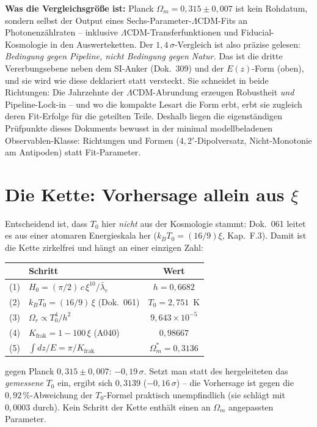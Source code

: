 \documentclass[11pt]{report}
\begin{document}
\textbf{Was die Vergleichsgröße ist:} Planck
$\Omega_m = 0{,}315 \pm 0{,}007$ ist kein Rohdatum, sondern
selbst der Output eines Sechs-Parameter-$\Lambda$CDM-Fits an
Photonenzählraten -- inklusive $\Lambda$CDM-Transferfunktionen
und Fiducial-Kosmologie in den Auswerteketten. Der
$1{,}4\,\sigma$-Vergleich ist also präzise gelesen:
\emph{Bedingung gegen Pipeline, nicht Bedingung gegen Natur.}
Das ist die dritte Vererbungsebene neben dem SI-Anker (Dok.~309)
und der $E(z)$-Form (oben), und sie wird wie diese deklariert
statt versteckt. Sie schneidet in beide Richtungen: Die
Jahrzehnte der $\Lambda$CDM-Abrundung erzeugen Robustheit
\emph{und} Pipeline-Lock-in -- und wo die kompakte Lesart die
Form erbt, erbt sie zugleich deren Fit-Erfolge für die geteilten
Teile. Deshalb liegen die eigenständigen Prüfpunkte dieses
Dokuments bewusst in der minimal modellbeladenen
Observablen-Klasse: Richtungen und Formen
($4{,}2'$-Dipolversatz, Nicht-Monotonie am Antipoden) statt
Fit-Parameter.

\section{Die Kette: Vorhersage allein aus $\xi$}

Entscheidend ist, dass $T_0$ hier \emph{nicht} aus der Kosmologie
stammt: Dok.~061 leitet es aus einer atomaren Energieskala her
($k_BT_0 = (16/9)\xi$, Kap.~F.3). Damit ist die Kette zirkelfrei
und hängt an einer einzigen Zahl:

\begin{center}
\begin{tabular}{clc}
\toprule
 & Schritt & Wert \\
\midrule
(1) & $H_0 = (\pi/2)\,c\,\xi^{10}/\bar\lambda_e$ & $h = 0{,}6682$ \\
(2) & $k_BT_0 = (16/9)\,\xi$ (Dok.~061) & $T_0 = 2{,}751$~K \\
(3) & $\Omega_r \propto T_0^4/h^2$ & $9{,}643\times10^{-5}$ \\
(4) & $K_\text{frak} = 1-100\,\xi$ (A040) & $0{,}98667$ \\
(5) & $\int dz/E = \pi/K_\text{frak}$ &
  $\boxed{\Omega_m^{*} = 0{,}3136}$ \\
\bottomrule
\end{tabular}
\end{center}

\noindent gegen Planck $0{,}315 \pm 0{,}007$: $-0{,}19\,\sigma$.
Setzt man statt des hergeleiteten das \emph{gemessene} $T_0$ ein,
ergibt sich $0{,}3139$ ($-0{,}16\,\sigma$) -- die Vorhersage ist
gegen die $0{,}92\,\%$-Abweichung der $T_0$-Formel praktisch
unempfindlich (sie schlägt mit $0{,}0003$ durch). Kein Schritt der
Kette enthält einen an $\Omega_m$ angepassten Parameter.
\end{document}
